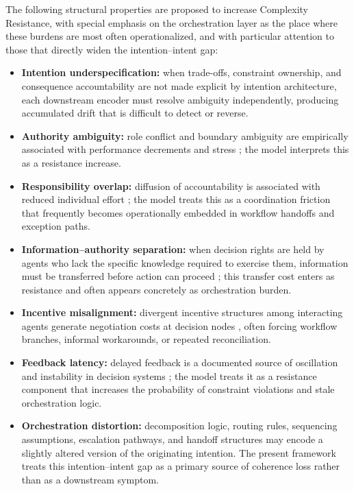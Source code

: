 \documentclass[12pt]{article}
\begin{document}
The following structural properties are proposed to increase Complexity
Resistance, with special emphasis on the orchestration layer as the place
where these burdens are most often operationalized, and with particular
attention to those that directly widen the intention--intent gap:

\begin{itemize}
  \item \textbf{Intention underspecification:} when trade-offs, constraint
    ownership, and consequence accountability are not made explicit by
    intention architecture, each downstream encoder must resolve ambiguity
    independently, producing accumulated drift that is difficult to detect or
    reverse.
  \item \textbf{Authority ambiguity:} role conflict and boundary ambiguity
    are empirically associated with performance decrements and stress
    \citep{rizzo1970role}; the model interprets this as a resistance increase.
  \item \textbf{Responsibility overlap:} diffusion of accountability is
    associated with reduced individual effort \citep{latane1979many}; the
    model treats this as a coordination friction that frequently becomes
    operationally embedded in workflow handoffs and exception paths.
  \item \textbf{Information--authority separation:} when decision rights are
    held by agents who lack the specific knowledge required to exercise them,
    information must be transferred before action can proceed
    \citep{jensen1992specific}; this transfer cost enters as resistance and
    often appears concretely as orchestration burden.
  \item \textbf{Incentive misalignment:} divergent incentive structures among
    interacting agents generate negotiation costs at decision nodes
    \citep{holmstrom1991multitask}, often forcing workflow branches,
    informal workarounds, or repeated reconciliation.
  \item \textbf{Feedback latency:} delayed feedback is a documented source of
    oscillation and instability in decision systems \citep{sterman1989modeling};
    the model treats it as a resistance component that increases the
    probability of constraint violations and stale orchestration logic.
  \item \textbf{Orchestration distortion:} decomposition logic, routing rules,
    sequencing assumptions, escalation pathways, and handoff structures may
    encode a slightly altered version of the originating intention. The present
    framework treats this intention--intent gap as a primary source of
    coherence loss rather than as a downstream symptom.
\end{itemize}
\end{document}
